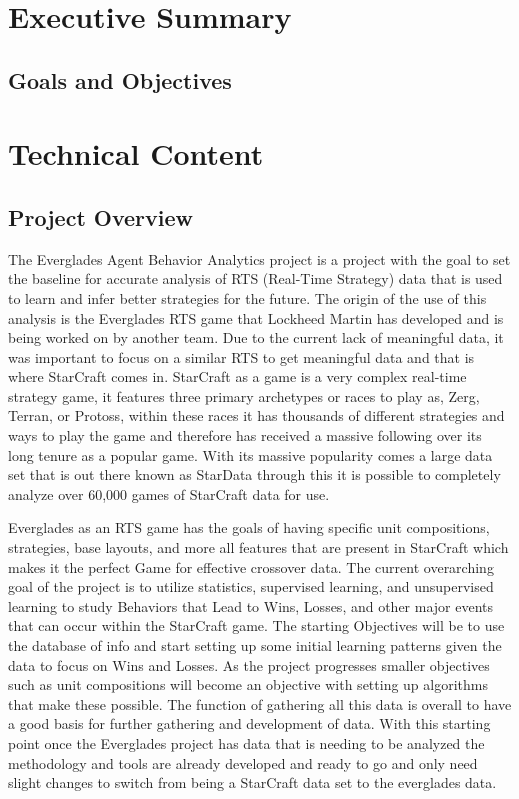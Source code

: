 \documentclass[a4paper,12pt]{report}
\begin{document}
\tableofcontents

\newpage

\setlength{\parskip}{\baselineskip}
\setlength{\parindent}{0in}

\chapter{Executive Summary}
\section{Goals and Objectives}

\chapter{Technical Content}
\section{Project Overview}

The Everglades Agent Behavior Analytics project is a project with the goal to set the baseline for accurate analysis of RTS (Real-Time Strategy) data that is used to learn and infer better strategies for the future. The origin of the use of this analysis is the Everglades RTS game that Lockheed Martin has developed and is being worked on by another team. Due to the current lack of meaningful data, it was important to focus on a similar RTS to get meaningful data and that is where StarCraft comes in. StarCraft as a game is a very complex real-time strategy game, it features three primary archetypes or races to play as, Zerg, Terran, or Protoss, within these races it has thousands of different strategies and ways to play the game and therefore has received a massive following over its long tenure as a popular game. With its massive popularity comes a large data set that is out there known as StarData through this it is possible to completely analyze over 60,000 games of StarCraft data for use.

Everglades as an RTS game has the goals of having specific unit compositions, strategies, base layouts, and more all features that are present in StarCraft which makes it the perfect Game for effective crossover data. The current overarching goal of the project is to utilize statistics, supervised learning, and unsupervised learning to study Behaviors that Lead to Wins, Losses, and other major events that can occur within the StarCraft game. The starting Objectives will be to use the database of info and start setting up some initial learning patterns given the data to focus on Wins and Losses. As the project progresses smaller objectives such as unit compositions will become an objective with setting up algorithms that make these possible.  The function of gathering all this data is overall to have a good basis for further gathering and development of data. With this starting point once the Everglades project has data that is needing to be analyzed the methodology and tools are already developed and ready to go and only need slight changes to switch from being a StarCraft data set to the everglades data.
\end{document}

